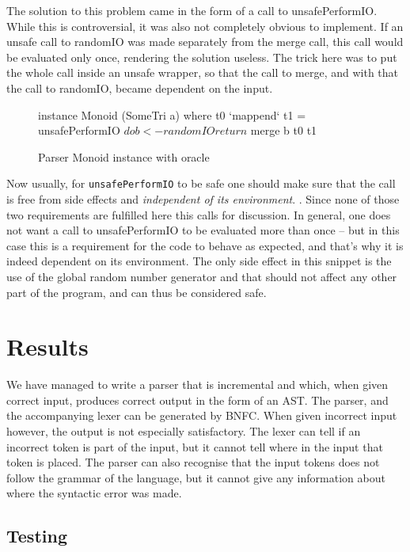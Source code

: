 \documentclass[a4paper,12pt,twosided]{report}
\begin{document}
The solution to this problem came in the form of a call to unsafePerformIO.
While this is controversial, it was also not completely obvious to implement. If
an unsafe call to randomIO was made separately from the merge call, this call
would be evaluated only once, rendering the solution useless. The trick here was
to put the whole call inside an unsafe wrapper, so that the call to merge, and
with that the call to randomIO, became dependent on the input.

\begin{figure}[H]
\begin{code}
instance Monoid (SomeTri a) where
    t0 `mappend` t1 = unsafePerformIO $ do
      b <- randomIO
      return $ merge b t0 t1
\end{code}
\caption{Parser Monoid instance with oracle}
\end{figure}

Now usually, for \texttt{unsafePerformIO} to be safe one should make sure that
the call is free from side effects and \textit{independent of its environment}.
\cite{unsafeHackage}. Since none of those two requirements are fulfilled here
this calls for discussion. In general, one does not want a call to
unsafePerformIO to be evaluated more than once -- but in this case this is a
requirement for the code to behave as expected, and that's why it is indeed
dependent on its environment. The only side effect in this snippet is the use of
the global random number generator and that should not affect any other part of
the program, and can thus be considered safe.

%
%

\chapter{Results}
We have managed to write a parser that is incremental and which, when given
correct input, produces correct output in the form of an AST. The parser, and
the accompanying lexer can be generated by BNFC. When given incorrect input
however, the output is not especially satisfactory. The lexer can tell if an
incorrect token is part of the input, but it cannot tell where in the input that
token is placed. The parser can also recognise that the input tokens does not
follow the grammar of the language, but it cannot give any information about
where the syntactic error was made.

\section{Testing}
\end{document}
